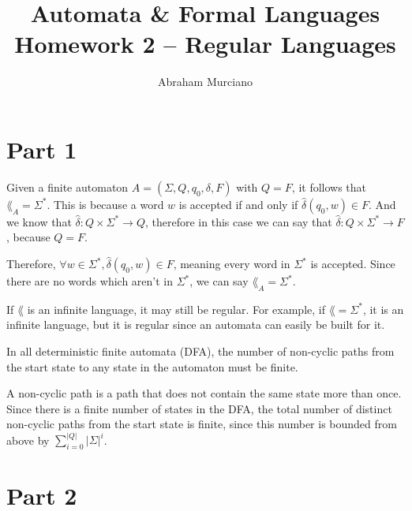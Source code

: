\documentclass[fleqn]{article}
\title{Automata \& Formal Languages \\
\medskip
\large Homework 2 -- Regular Languages}
\author{Abraham Murciano}
\begin{document}
\maketitle

\section*{Part 1}

\begin{answers}

	\item %
	Given a finite automaton \(A = (\Sigma, Q, q_0, \delta, F)\) with \(Q = F\), it follows that \(\lang_A = \Sigma^*\). This is because a word \(w\) is accepted if and only if \(\hat{\delta}(q_0,w) \in F\). And we know that \(\hat{\delta} : Q \times \Sigma^* \to Q\), therefore in this case we can say that \(\hat{\delta} : Q \times \Sigma^* \to F\), because \(Q = F\).

	Therefore, \(\forall w \in \Sigma^*, \hat{\delta}(q_0, w) \in F\), meaning every word in \(\Sigma^*\) is accepted. Since there are no words which aren't in \(\Sigma^*\), we can say \(\lang_A = \Sigma^*\).

	\item %
	If \(\lang\) is an infinite language, it may still be regular. For example, if \(\lang = \Sigma^*\), it is an infinite language, but it is regular since an automata can easily be built for it.

	\item %

	\item %
	In all deterministic finite automata (DFA), the number of non-cyclic paths from the start state to any state in the automaton must be finite.

	A non-cyclic path is a path that does not contain the same state more than once. Since there is a finite number of states in the DFA, the total number of distinct non-cyclic paths from the start state is finite, since this number is bounded from above by \(\sum_{i=0}^{|Q|} |\Sigma|^{i}\).
\end{answers}

\section*{Part 2}
\end{document}

